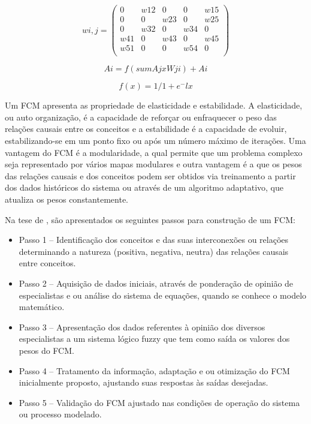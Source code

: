 \begin{equation}\label{fcm-matrix}
    wi,j=\left(
       \begin{array}{ccccc}
         0 & w12 & 0 & 0 & w15 \\
         0 & 0 & w23 & 0 & w25 \\
         0 & w32 & 0 & w34 & 0 \\
         w41 & 0 & w43 & 0 & w45 \\
         w51 & 0 & 0 & w54 & 0 \\
       \end{array}
     \right)
\end{equation}

\begin{equation}\label{fcm-update}
Ai=f(sum{AjxWji})+Ai
\end{equation}

\begin{equation}\label{sigmoide}
f(x)={1}/{1+e^-lx}
\end{equation}

Um FCM apresenta as propriedade de elasticidade e estabilidade. A elasticidade, ou auto organização, é a capacidade de reforçar ou enfraquecer o peso das relações causais entre os conceitos e a estabilidade é a capacidade de evoluir, estabilizando-se em um ponto fixo ou após um número máximo de iterações. Uma vantagem do FCM é a modularidade, a qual permite que um problema complexo seja representado por vários mapas modulares e outra vantagem é a que os pesos das relações causais e dos conceitos podem ser obtidos via treinamento a partir dos dados históricos do sistema ou através de um algoritmo adaptativo, que atualiza os pesos constantemente.

Na tese de \cite{FCMENDONCA}, são apresentados os seguintes passos para construção de um FCM:

\begin{itemize}{*}{}
\item Passo 1 – Identificação dos conceitos e das suas interconexões ou relações
determinando a natureza (positiva, negativa, neutra) das relações causais entre
conceitos.
\item Passo 2 – Aquisição de dados iniciais, através de ponderação de opinião de
especialistas e ou análise do sistema de equações, quando se conhece o modelo
matemático.
\item Passo 3 – Apresentação dos dados referentes à opinião dos diversos especialistas a
um sistema lógico fuzzy que tem como saída os valores dos pesos do FCM.
\item Passo 4 – Tratamento da informação, adaptação e ou otimização do FCM
inicialmente proposto, ajustando suas respostas às saídas desejadas.
\item Passo 5 – Validação do FCM ajustado nas condições de operação do sistema ou
processo modelado.
\end{itemize}

